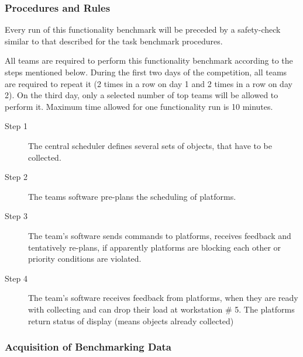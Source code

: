 \subsubsection{Procedures and Rules}
\label{sssec:PlanningSchedulingProcedures}

Every run of this functionality benchmark will be preceded by a safety-check similar to that described for the task benchmark procedures. 

All teams are required to perform this functionality benchmark according to the steps mentioned below. During the first two days of the competition, all teams are required to repeat it (2 times in a row on day 1 and 2 times in a row on day 2). On the third day, only a selected number of top teams will be allowed to perform it. Maximum time allowed for one functionality run is 10 minutes.

%
\begin{description}
\item[Step 1] The central scheduler defines several sets of objects, that have to be collected.
\item[Step 2] The teams software pre-plans the scheduling of platforms.
\item[Step 3] The team's software sends commands to platforms, receives feedback and tentatively re-plans, if apparently platforms are blocking each other or priority conditions are violated.
\item[Step 4] The team's software receives feedback from platforms, when they are ready with collecting and can drop their load at workstation \# 5. The platforms return status of display (means objects already collected)
\end{description} 
%

\subsubsection{Acquisition of Benchmarking Data}
\label{sssec:PlanningSchedulingData}

